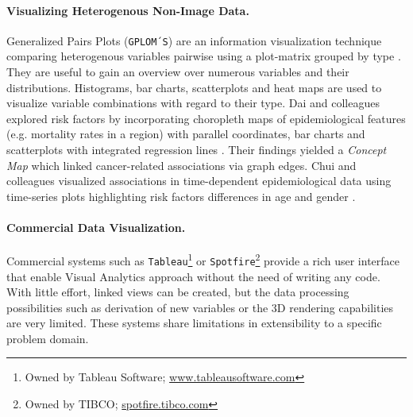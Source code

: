 \documentclass[journal]{style/vgtc} 			          %
\begin{document}
\paragraph{Visualizing Heterogenous Non-Image Data.}
Generalized Pairs Plots (\texttt{GPLOM´S}) are an information visualization technique comparing heterogenous variables pairwise using a plot-matrix grouped by type \cite{Francois2013}.
%
They are useful to gain an overview over numerous variables and their distributions.
%
Histograms, bar charts, scatterplots and heat maps are used to visualize variable combinations with regard to their type.
%
%
%
%
Dai and colleagues explored risk factors by incorporating choropleth maps of epidemiological features (e.g. mortality rates in a region) with parallel coordinates, bar charts and scatterplots with integrated regression lines \cite{Dai2005}.
%
Their findings yielded a \emph{Concept Map} which linked cancer-related associations via graph edges.
Chui and colleagues visualized associations in time-dependent epidemiological data using time-series plots highlighting risk factors differences in age and gender \cite{Chui2011}.

\paragraph{Commercial Data Visualization.}
Commercial systems such as \texttt{Tableau}\footnote{Owned by Tableau Software; \url{www.tableausoftware.com}} or \texttt{Spotfire}\footnote{Owned by TIBCO; \url{spotfire.tibco.com}} provide a rich user interface that enable Visual Analytics approach without the need of writing any code.
%
With little effort, linked views can be created, but the data processing possibilities such as derivation of new variables or the 3D rendering capabilities are very limited.
%
These systems share limitations in extensibility to a specific problem domain.
\end{document}

